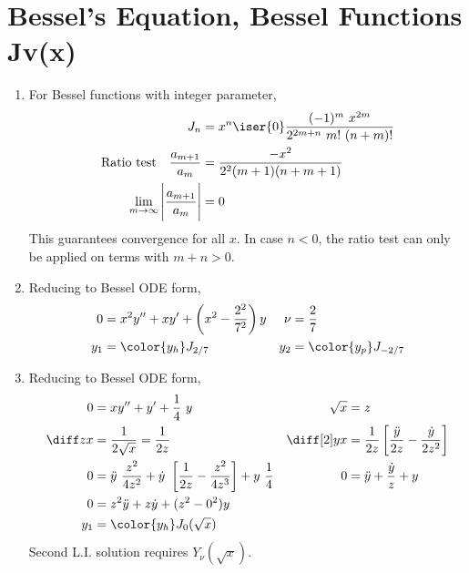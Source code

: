 \section{Bessel's Equation, Bessel Functions Jv(x)}
\begin{enumerate}
    \item For Bessel functions with integer parameter,
          \begin{align}
              J_n                               & = x^n \iser{0}\frac{(-1)^m\ x^{2m}}
              {2^{2m+n}\ m!\ (n+m)!}                                                  \\
              \text{Ratio test} \quad
              \frac{a_{m+1}}{a_m}               & = \frac{-x^2}{2^2(m+1)(n+m+1)}      \\
              \lim_{m \to \infty}
              \Bigg| \frac{a_{m+1}}{a_m} \Bigg| & = 0
          \end{align}
          This guarantees convergence for all $ x $. In case $ n < 0 $, the ratio
          test can only be applied on terms with $ m + n > 0  $.

    \item Reducing to Bessel ODE form,
          \begin{align}
              0   & = x^2y'' + xy' + \left( x^2 - \frac{2^2}{7^2} \right)y &
              \nu & = \frac{2}{7}                                            \\
              y_1 & = \color{y_h} J_{2/7}                                  &
              y_2 & = \color{y_p} J_{-2/7}
          \end{align}

    \item Reducing to Bessel ODE form,
          \begin{align}
              0                & = xy'' + y' + \frac{1}{4}\ y              &
              \sqrt{x}         & = z                                         \\
              \diff zx         & = \frac{1}{2\sqrt{x}} = \frac{1}{2z}      &
              \diff[2] yx      & = \frac{1}{2z} \left[ \frac{\ddot{y}}{2z}
              - \frac{\dot{y}}{2z^2} \right]                                 \\
              0                & = \ddot{y}\ \frac{z^2}{4z^2}
              + \dot{y}\ \left[\frac{1}{2z} - \frac{z^2}{4z^3}\right]
              + y\ \frac{1}{4} &
              0                & = \ddot{y} + \frac{\dot{y}}{z} + y          \\
              0                & = z^2 \ddot{y} + z\dot{y} + (z^2 - 0^2)y    \\
              y_1              & = \color{y_h} J_0(\sqrt{x})
          \end{align}
          Second L.I. solution requires $ Y_{\nu}(\sqrt{x}) $.


\end{enumerate}
